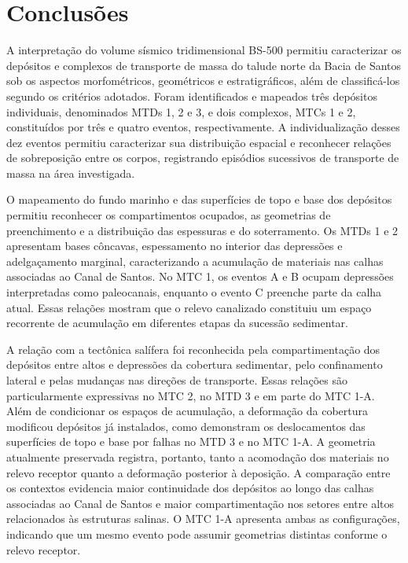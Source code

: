 \chapter{Conclusões}\label{cap:conclusoes}

A interpretação do volume sísmico tridimensional BS-500 permitiu caracterizar os depósitos e complexos de transporte de massa do talude norte da Bacia de Santos sob os aspectos morfométricos, geométricos e estratigráficos, além de classificá-los segundo os critérios adotados. Foram identificados e mapeados três depósitos individuais, denominados MTDs 1, 2 e 3, e dois complexos, MTCs 1 e 2, constituídos por três e quatro eventos, respectivamente. A individualização desses dez eventos permitiu caracterizar sua distribuição espacial e reconhecer relações de sobreposição entre os corpos, registrando episódios sucessivos de transporte de massa na área investigada.

O mapeamento do fundo marinho e das superfícies de topo e base dos depósitos permitiu reconhecer os compartimentos ocupados, as geometrias de preenchimento e a distribuição das espessuras e do soterramento. Os MTDs 1 e 2 apresentam bases côncavas, espessamento no interior das depressões e adelgaçamento marginal, caracterizando a acumulação de materiais nas calhas associadas ao Canal de Santos. No MTC 1, os eventos A e B ocupam depressões interpretadas como paleocanais, enquanto o evento C preenche parte da calha atual. Essas relações mostram que o relevo canalizado constituiu um espaço recorrente de acumulação em diferentes etapas da sucessão sedimentar.

A relação com a tectônica salífera foi reconhecida pela compartimentação dos depósitos entre altos e depressões da cobertura sedimentar, pelo confinamento lateral e pelas mudanças nas direções de transporte. Essas relações são particularmente expressivas no MTC 2, no MTD 3 e em parte do MTC 1-A. Além de condicionar os espaços de acumulação, a deformação da cobertura modificou depósitos já instalados, como demonstram os deslocamentos das superfícies de topo e base por falhas no MTD 3 e no MTC 1-A. A geometria atualmente preservada registra, portanto, tanto a acomodação dos materiais no relevo receptor quanto a deformação posterior à deposição. A comparação entre os contextos evidencia maior continuidade dos depósitos ao longo das calhas associadas ao Canal de Santos e maior compartimentação nos setores entre altos relacionados às estruturas salinas. O MTC 1-A apresenta ambas as configurações, indicando que um mesmo evento pode assumir geometrias distintas conforme o relevo receptor.

